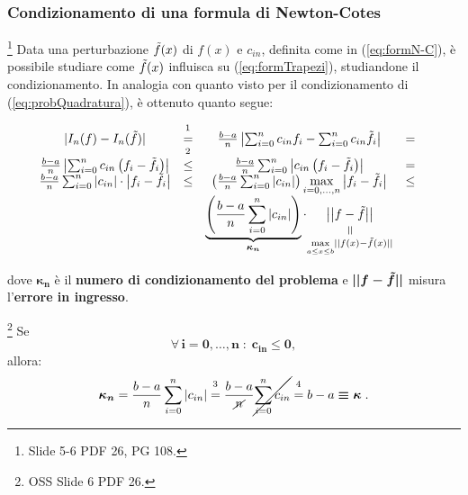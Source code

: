 \subsubsection{Condizionamento di una formula di Newton-Cotes}
\footnote{Slide 5-6 PDF 26, PG 108.}
Data una perturbazione $\Tilde{f}(x)$ di $f(x)$ e $c_{in}$, definita come in (\ref{eq:formN-C}), è possibile studiare come $\Tilde{f}(x)$ influisca su (\ref{eq:formTrapezi}), studiandone il condizionamento. In analogia con quanto visto per il condizionamento di (\ref{eq:probQuadratura}), è ottenuto quanto segue:

\begin{equation*}
    \begin{matrix}
        |I_n(f)-I_n(\Tilde{f})|&\overset{\footnotemark}{=}&\frac{b-a}{n}\left|\sum_{i=0}^n c_{in}f_i-\sum_{i=0}^n c_{in}\Tilde{f_i}\right|&=&\\
        \frac{b-a}{n}\left|\sum_{i=0}^n c_{in}\left(f_i-\Tilde{f_i}\right)\right|&\overset{\footnotemark}{\leq}&\frac{b-a}{n}\sum_{i=0}^n \left|c_{in}\left(f_i-\Tilde{f_i}\right)\right|&=&\\
        \frac{b-a}{n}\sum_{i=0}^n |c_{in}|\cdot\left|f_i-\Tilde{f_i}\right|&\leq&\left(\frac{b-a}{n}\sum_{i=0}^n|c_{in}|\right)\underset{i=0,\hdots,n}{\max}\left|f_i-\Tilde{f_i}\right|&\leq&\\
        && \underbrace{\left(\frac{b-a}{n}\sum_{i=0}^n|c_{in}|\right)}_{\boldsymbol{\kappa_n}}\cdot \equalto{\left|\left|f-\Tilde{f}\right|\right|}{\underset{a\leq x\leq b}{\max}||f(x)-\Tilde{f}(x)||}
    \end{matrix}
\end{equation*}
\addtocounter{footnote}{-1}


\noindent dove $\boldsymbol{\kappa_n}$ è il \textbf{numero di condizionamento del problema} e $\boldsymbol{||f-\Tilde{f}||}$ misura l'\textbf{errore in ingresso}.

\begin{remark}
    \footnote{OSS Slide 6 PDF 26.} Se
    \begin{equation}\label{eq:coeffFormN-CGT0}
        \boldsymbol{\forall\, i=0,\hdots, n\; :\; c_{in}\leq 0,}
    \end{equation}
    allora:
    \begin{equation}\label{eq:nrCondN-C}
     \boldsymbol{\kappa_n}=\frac{b-a}{n}\sum_{i=0}^n|c_{in}|\overset{\footnotemark}{=}\frac{b-a}{\cancel{n}}\cancel{\sum_{i=0}^nc_{in}}\overset{\footnotemark}{=}b-a\boldsymbol{\equiv\kappa}.
    \end{equation}

\end{remark}
\addtocounter{footnote}{-1}

